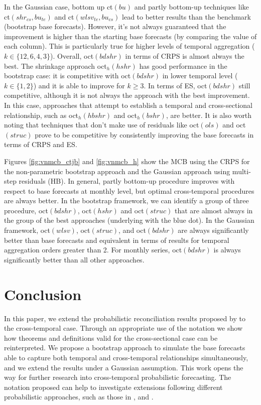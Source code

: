 \documentclass[a4paper,11pt]{article}
\theoremstyle{definition}
\begin{document}
In the Gaussian case, bottom up ct$(bu)$ and partly bottom-up techniques like ct$(shr_{cs}, bu_{te})$ and ct$(wlsv_{te}, bu_{cs})$ lead to better results than the benchmark (bootstrap base forecasts). However, it's not always guaranteed that the improvement is higher than the starting base forecasts (by comparing the value of each column). This is particularly true for higher levels of temporal aggregation ($k \in \{12, 6, 4, 3\}$). Overall, oct$(bdshr)$ in terms of CRPS is almost always the best. The shrinkage approach oct$_h(hshr)$ has good performance in the bootstrap case: it is competitive with oct$(bdshr)$ in lower temporal level ($k \in \{1,2\}$) and it is able to improve for $k\ge 3$. In terms of ES, oct$(bdshr)$ still competitive, although it is not always the approach with the best improvement. In this case, approaches that attempt to establish a temporal and cross-sectional relationship, such as oct$_h(hbshr)$ and oct$_h(bshr)$, are better. %
It is also worth noting that techniques that don't make use of residuals like oct$(ols)$ and oct$(struc)$ prove to be competitive by consistently improving the base forecasts in terms of CRPS and ES.

Figures \ref{fig:vnmcb_ctjb} and \ref{fig:vnmcb_h} show the MCB using the CRPS for the non-parametric bootstrap approach and the Gaussian approach using multi-step residuals (HB). In general, partly bottom-up procedure improves with respect to base forecasts at monthly level, but optimal cross-temporal procedures are always better. In the bootstrap framework, we can identify a group of three procedure, oct$(bdshr)$, oct$(hshr)$ and oct$(struc)$ that are almost always in the group of the best approaches (underlying with the blue dot). In the Gaussian framework, oct$(wlsv)$, oct$(struc)$, and oct$(bdshr)$ are always significantly better than base forecasts and equivalent in terms of results for temporal aggregation orders greater than 2. For monthly series, oct$(bdshr)$ is always significantly better than all other approaches.

\section{Conclusion}\label{sec:conclusion}

In this paper, we extend the probabilistic reconciliation results proposed by \cite{panagiotelis2023} to the cross-temporal case. Through an appropriate use of the notation we show how theorems and definitions valid for the cross-sectional case can be reinterpreted. We propose a bootstrap approach to simulate the base forecasts able to capture both temporal and cross-temporal relationships simultaneously, and we extend the results under a Gaussian assumption. This work opens the way for further research into  cross-temporal probabilistic forecasting. The notation proposed can help to investigate extensions following different probabilistic approaches, such as those in \cite{jeon2019}, \cite{bentaieb2021} and \cite{corani2022}.
\end{document}
